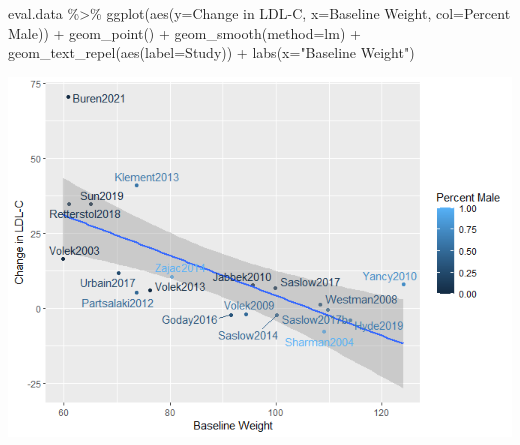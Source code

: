 \documentclass[
]{article}
\newenvironment{Shaded}{\begin{snugshade}}{\end{snugshade}}
\newcommand{\AttributeTok}[1]{\textcolor[rgb]{0.77,0.63,0.00}{#1}}
\newcommand{\FunctionTok}[1]{\textcolor[rgb]{0.00,0.00,0.00}{#1}}
\newcommand{\NormalTok}[1]{#1}
\newcommand{\SpecialCharTok}[1]{\textcolor[rgb]{0.00,0.00,0.00}{#1}}
\newcommand{\StringTok}[1]{\textcolor[rgb]{0.31,0.60,0.02}{#1}}
\begin{document}
\begin{Shaded}
\begin{Highlighting}[]
\NormalTok{eval.data }\SpecialCharTok{\%\textgreater{}\%}
  \FunctionTok{ggplot}\NormalTok{(}\FunctionTok{aes}\NormalTok{(}\AttributeTok{y=}\StringTok{\textasciigrave{}}\AttributeTok{Change in LDL{-}C}\StringTok{\textasciigrave{}}\NormalTok{,}
             \AttributeTok{x=}\StringTok{\textasciigrave{}}\AttributeTok{Baseline Weight}\StringTok{\textasciigrave{}}\NormalTok{,}
             \AttributeTok{col=}\StringTok{\textasciigrave{}}\AttributeTok{Percent Male}\StringTok{\textasciigrave{}}\NormalTok{)) }\SpecialCharTok{+}
  \FunctionTok{geom\_point}\NormalTok{() }\SpecialCharTok{+}
  \FunctionTok{geom\_smooth}\NormalTok{(}\AttributeTok{method=}\StringTok{\textquotesingle{}lm\textquotesingle{}}\NormalTok{) }\SpecialCharTok{+}
  \FunctionTok{geom\_text\_repel}\NormalTok{(}\FunctionTok{aes}\NormalTok{(}\AttributeTok{label=}\NormalTok{Study)) }\SpecialCharTok{+}
  \FunctionTok{labs}\NormalTok{(}\AttributeTok{x=}\StringTok{"Baseline Weight"}\NormalTok{)}
\end{Highlighting}
\end{Shaded}

\includegraphics{figures/ldl-change-vs-weight-5.png}
\end{document}
